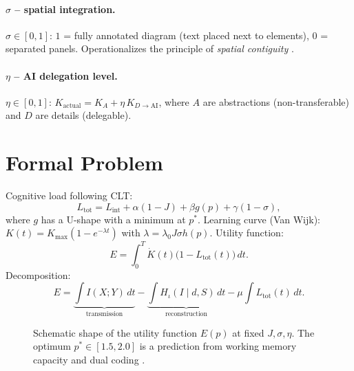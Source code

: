 \documentclass[10pt,a4paper]{article}
\begin{document}
\paragraph{$\sigma$ – spatial integration.}
$\sigma \in [0,1]$: $1$ = fully annotated diagram (text placed next to
elements), $0$ = separated panels. Operationalizes the principle of
\emph{spatial contiguity} \cite{mayer2021}.

\paragraph{$\eta$ – AI delegation level.}
$\eta \in [0,1]$: $K_{\text{actual}} = K_A + \eta\, K_{D \to \text{AI}}$,
where $A$ are abstractions (non-transferable) and $D$ are details
(delegable).

\section{Formal Problem}

Cognitive load following CLT:
\begin{equation}
L_{\text{tot}} = L_{\text{int}} + \alpha(1-J) + \beta g(p) + \gamma(1-\sigma),
\end{equation}
where $g$ has a U-shape with a minimum at $p^{*}$. Learning curve
(Van Wijk): $K(t) = K_{\max}(1 - e^{-\lambda t})$ with
$\lambda = \lambda_0 J \sigma h(p)$. Utility function:
\begin{equation}
E = \int_0^T \dot K(t)\bigl(1 - L_{\text{tot}}(t)\bigr)\,dt.
\end{equation}
Decomposition:
\begin{equation}
E = \underbrace{\int I(X;Y)\,dt}_{\text{transmission}}
  - \underbrace{\int H_{\iota}(I\mid d,S)\,dt}_{\text{reconstruction}}
  - \mu\!\int L_{\text{tot}}(t)\,dt.
\end{equation}

\begin{figure}[h]
\centering
{}
\caption{Schematic shape of the utility function $E(p)$ at fixed
$J, \sigma, \eta$. The optimum $p^{*} \in [1.5, 2.0]$ is a prediction
from working memory capacity \cite{cowan2001} and dual coding
\cite{paivio1990}.}
\label{fig:epcurve}
\end{figure}
\end{document}
